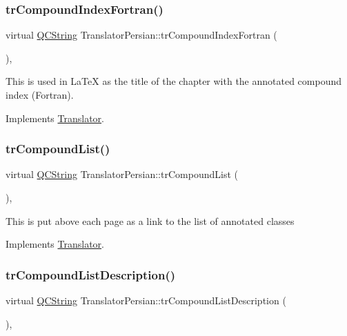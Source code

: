 \subsubsection{\texorpdfstring{trCompoundIndexFortran()}{trCompoundIndexFortran()}}
{\footnotesize\ttfamily virtual \mbox{\hyperlink{class_q_c_string}{Q\+C\+String}} Translator\+Persian\+::tr\+Compound\+Index\+Fortran (\begin{DoxyParamCaption}{ }\end{DoxyParamCaption})\hspace{0.3cm}{\ttfamily [inline]}, {\ttfamily [virtual]}}

This is used in La\+TeX as the title of the chapter with the annotated compound index (Fortran). 

Implements \mbox{\hyperlink{class_translator}{Translator}}.

\mbox{\label{class_translator_persian_a2cd1595b863b8d413a2a072167925fa3}} 
\subsubsection{\texorpdfstring{trCompoundList()}{trCompoundList()}}
{\footnotesize\ttfamily virtual \mbox{\hyperlink{class_q_c_string}{Q\+C\+String}} Translator\+Persian\+::tr\+Compound\+List (\begin{DoxyParamCaption}{ }\end{DoxyParamCaption})\hspace{0.3cm}{\ttfamily [inline]}, {\ttfamily [virtual]}}

This is put above each page as a link to the list of annotated classes 

Implements \mbox{\hyperlink{class_translator}{Translator}}.

\mbox{\label{class_translator_persian_a4ec6a990f0ab83400a806ccd4a518039}} 
\subsubsection{\texorpdfstring{trCompoundListDescription()}{trCompoundListDescription()}}
{\footnotesize\ttfamily virtual \mbox{\hyperlink{class_q_c_string}{Q\+C\+String}} Translator\+Persian\+::tr\+Compound\+List\+Description (\begin{DoxyParamCaption}{ }\end{DoxyParamCaption})\hspace{0.3cm}{\ttfamily [inline]}, {\ttfamily [virtual]}}

